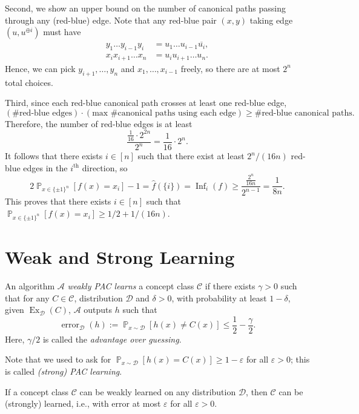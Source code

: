 \documentclass[letterpaper, reqno,11pt]{article}
\newcommand{\PP}{\mathop{{}\mathbb{P}}}
\DeclareMathOperator{\Ex}{Ex}
\DeclareMathOperator{\error}{error}
\DeclareMathOperator{\Inf}{Inf}
\begin{document}
Second, we show an upper bound on the number of canonical paths passing through any (red-blue) edge. Note that any red-blue pair $(x, y)$ taking edge $(u, u^{\oplus i})$ must have
\begin{align*}
  y_1 \ldots y_{i - 1} y_i &= u_1 \ldots u_{i - 1} \overline{u_i}, \\
  x_i x_{i + 1} \ldots x_n &= u_i u_{i + 1} \ldots u_n.
\end{align*}
Hence, we can pick $y_{i + 1}, \ldots, y_n$ and $x_1, \ldots, x_{i - 1}$ freely, so there are at most $2^n$ total choices.

Third, since each red-blue canonical path crosses at least one red-blue edge,
$$ (\text{\# red-blue edges}) \cdot (\text{max \# canonical paths using each edge}) \geq \text{\# red-blue canonical paths}. $$
Therefore, the number of red-blue edges is at least
$$ \frac{\frac{1}{16} \cdot 2^{2n}}{2^n} = \frac{1}{16} \cdot 2^n. $$
It follows that there exists $i \in [n]$ such that there exist at least $2^n/(16n)$ red-blue edges in the $i^\text{th}$ direction, so
$$ 2\PP_{x \in \{ \pm 1 \}^n}\left[f(x) = x_i\right] - 1 = \hat{f}(\{ i \}) = \Inf_i(f) \geq \frac{\frac{2^n}{16n}}{2^{n - 1}} = \frac{1}{8n}. $$
This proves that there exists $i \in [n]$ such that $\PP_{x \in \{ \pm 1 \}^n}[f(x) = x_i] \geq 1/2 + 1/(16n)$.

\section{Weak and Strong Learning}

\begin{definition}
  An algorithm $\mathcal A$ \emph{weakly PAC learns} a concept class $\mathcal C$ if there exists $\gamma > 0$ such that for any $C \in \mathcal C$, distribution $\mathcal D$ and $\delta > 0$, with probability at least $1 - \delta$, given $\Ex_\mathcal{D}(C)$, $\mathcal A$ outputs $h$ such that
  \begin{equation} \label{eq:weak}
    \error_{\mathcal D}(h) := \PP_{x \sim \mathcal D}[h(x) \neq C(x)] \leq \frac{1}{2} - \frac{\gamma}{2}.
  \end{equation}
  Here, $\gamma/2$ is called the \emph{advantage over guessing}.
\end{definition}

Note that we used to ask for $\PP_{x \sim \mathcal D}[h(x) = C(x)] \geq 1 - \varepsilon$ for all $\varepsilon > 0$; this is called \emph{(strong) PAC learning}.

\begin{theorem} \label{thm:weak-strong}
  If a concept class $\mathcal C$ can be weakly learned on any distribution $\mathcal D$, then $\mathcal C$ can be (strongly) learned, i.e., with error at most $\varepsilon$ for all $\varepsilon > 0$.
\end{theorem}
\end{document}
